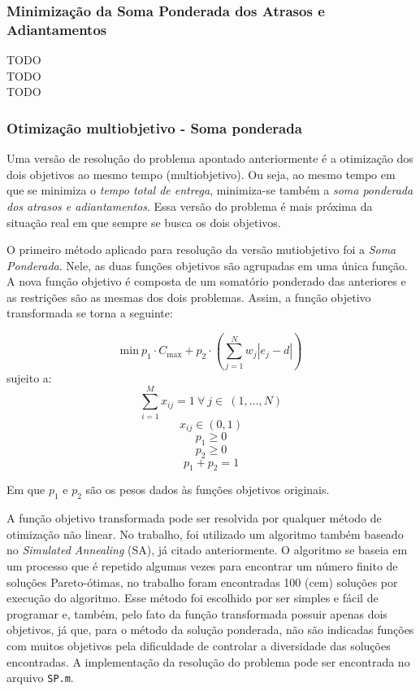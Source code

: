 \documentclass[conference]{IEEEtran}
\begin{document}
\subsubsection{Minimização da Soma Ponderada dos Atrasos e Adiantamentos}
TODO
\\
TODO
\\TODO
\subsubsection{Otimização multiobjetivo - Soma ponderada}
Uma versão de resolução do problema apontado anteriormente é a otimização dos dois objetivos ao mesmo tempo (multiobjetivo). Ou seja, ao mesmo tempo em que se minimiza o \emph{tempo total de entrega}, minimiza-se também a \emph{soma ponderada dos atrasos e adiantamentos}. Essa versão do problema é mais próxima da situação real em que sempre se busca os dois objetivos.

O primeiro método  aplicado para resolução da versão mutiobjetivo foi a \emph{Soma Ponderada}. Nele, as duas funções objetivos são agrupadas em uma única função. A nova função objetivo é composta de um somatório ponderado das anteriores e as restrições são as mesmas dos dois problemas. Assim, a função objetivo transformada se torna a seguinte:

\[\mathrm{min}\ p_1 \cdot C_{\mathrm{max}} + p_2 \cdot \left( \sum_{j=1}^{N}w_j|e_j-d| \right)\]
sujeito a:
\begin{equation}
\sum_{i=1}^{M}x_{ij}=1\ \forall\ j \in\ (1,...,N)
\label{eq:rest4}
\end{equation}
\[x_{ij} \in (0, 1)\]
\[p_1 \ge 0\]
\[p_2 \ge 0\]
\[p_1 + p_2 = 1\]

Em que $p_1$ e $p_2$ são os pesos dados às funções objetivos originais.

A função objetivo transformada pode ser resolvida por qualquer método de otimização não linear. No trabalho, foi utilizado um algoritmo também baseado no \emph{Simulated Annealing} (SA), já citado anteriormente. O algoritmo se baseia em um processo que é repetido algumas vezes para encontrar um número finito de soluções Pareto-ótimas, no trabalho foram encontradas 100 (cem) soluções por execução do algoritmo. Esse método foi escolhido por ser simples e fácil de programar e, também, pelo fato da função transformada possuir apenas dois objetivos, já que, para o método da solução ponderada, não são indicadas funções com muitos objetivos pela dificuldade de controlar a diversidade das soluções encontradas. A implementação da resolução do problema pode ser encontrada no arquivo \texttt{SP.m}.
\end{document}
